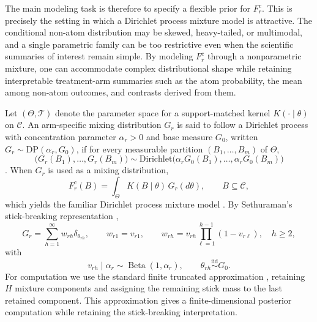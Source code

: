 \documentclass[11pt]{article}
\DeclareMathOperator*{\Beta}{Beta}
\begin{document}
The main modeling task is therefore to specify a flexible prior for $F_r^c$. This is precisely the setting in which a Dirichlet process mixture model is attractive. The conditional non-atom distribution may be skewed, heavy-tailed, or multimodal, and a single parametric family can be too restrictive even when the scientific summaries of interest remain simple. By modeling $F_r^c$ through a nonparametric mixture, one can accommodate complex distributional shape while retaining interpretable treatment-arm summaries such as the atom probability, the mean among non-atom outcomes, and contrasts derived from them.

Let $(\Theta,\mathcal{T})$ denote the parameter space for a support-matched kernel $K(\cdot \mid \theta)$ on $\mathcal{C}$. An arm-specific mixing distribution $G_r$ is said to follow a Dirichlet process with concentration parameter $\alpha_r > 0$ and base measure $G_0$, written $G_r \sim \mathrm{DP}(\alpha_r,G_0)$, if for every measurable partition $(B_1,\ldots,B_m)$ of $\Theta$,
\[
  \bigl(G_r(B_1),\ldots,G_r(B_m)\bigr)
  \sim
  \mathrm{Dirichlet}\bigl(\alpha_r G_0(B_1),\ldots,\alpha_r G_0(B_m)\bigr)
\]
\citep{ferguson1973bayesian}. When $G_r$ is used as a mixing distribution,
\[
  F_r^c(B) = \int_{\Theta} K(B \mid \theta)\,G_r(d\theta),
  \qquad B \subseteq \mathcal{C},
\]
which yields the familiar Dirichlet process mixture model \citep{antoniak1974mixtures}. By Sethuraman's stick-breaking representation \citep{sethuraman1994constructive},
\[
  G_r = \sum_{h=1}^{\infty} w_{rh}\delta_{\theta_{rh}},
  \qquad
  w_{r1} = v_{r1},
  \qquad
  w_{rh} = v_{rh}\prod_{\ell=1}^{h-1}(1-v_{r\ell}),
  \quad h \geq 2,
\]
with
\[
  v_{rh} \mid \alpha_r \sim \Beta(1,\alpha_r),
  \qquad
  \theta_{rh} \stackrel{\mathrm{iid}}{\sim} G_0.
\]
For computation we use the standard finite truncated approximation \citep{ishwaran2001gibbs}, retaining $H$ mixture components and assigning the remaining stick mass to the last retained component. This approximation gives a finite-dimensional posterior computation while retaining the stick-breaking interpretation.
\end{document}
